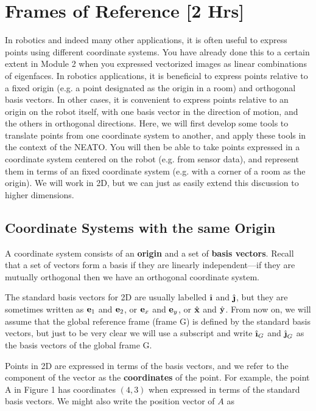 \documentclass[M3_Night6_Solutions]{subfiles}
\begin{document}
\clearpage

\section{Frames of Reference [2 Hrs]}

In robotics and indeed many other applications, it is often useful to express points using different coordinate systems. You have already done this to a certain extent in Module 2 when you expressed vectorized images as linear combinations of eigenfaces. In robotics applications, it is beneficial to express points relative to a fixed origin (e.g. a point designated as the origin in a room) and orthogonal basis vectors. In other cases, it is convenient to express points relative to an origin on the robot itself, with one basis vector in the direction of motion, and the others in orthogonal directions. Here, we will first develop some tools to translate points from one coordinate system to another, and apply these tools in the context of the NEATO. You will then be able to take points expressed in a coordinate system centered on the robot (e.g. from sensor data), and represent them in terms of an fixed coordinate system (e.g. with a corner of a room as the origin). We will work in 2D, but we can just as easily extend this discussion to higher dimensions.

\subsection{Coordinate Systems with the same Origin}

A coordinate system consists of an {\bf origin} and a set of {\bf basis vectors}. Recall that a set of vectors form a basis if they are linearly independent---if they are mutually orthogonal then we have an orthogonal coordinate system.

The standard basis vectors for 2D are usually labelled $\ihat$ and $\jhat$, but they are sometimes written as $\mathbf{e}_1$ and $\mathbf{e}_2$, or $\mathbf{e}_x$ and $\mathbf{e}_y$, or $\hat{\mathbf{x}}$ and $\hat{\mathbf{y}}$. From now on, we will assume that the global reference frame (frame G) is defined by the standard basis vectors, but just to be very clear we will use a subscript and write $\ihat_G$ and $\jhat_G$ as the basis vectors of the global frame G.


Points in 2D are expressed in terms of the basis vectors, and we refer to the component of the vector as the {\bf coordinates} of the point. For example, the point A in Figure 1 has coordinates $(4,3)$ when expressed in terms of the standard basis vectors. We might also write the position vector of $A$ as
\end{document}
